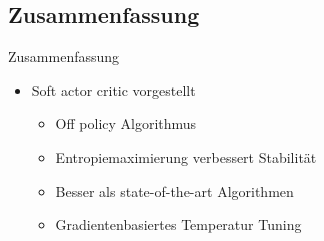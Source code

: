

\subsection{Zusammenfassung}
\begin{frame}{Zusammenfassung}
        \begin{itemize}
            \item Soft actor critic vorgestellt
            \begin{itemize}
                \item Off policy Algorithmus
                \item Entropiemaximierung verbessert Stabilität
                \item Besser als state-of-the-art Algorithmen 
                \item Gradientenbasiertes Temperatur Tuning
            \end{itemize} 
        \end{itemize}
\end{frame}

